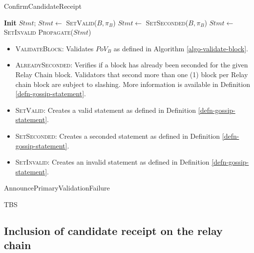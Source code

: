 \begin{algorithm}
  \caption[]{\sc ConfirmCandidateReceipt}
  \label{algo-endorse-candidate-receipt}
  \begin{algorithmic}[1]
      \State \textbf{Init} $Stmt$;
          \State $Stmt \leftarrow$ \textsc{SetValid($B, \pi_B$)}
        \Else
          \State $Stmt \leftarrow$ \textsc{SetSeconded($B, \pi_B$)}
        \EndIf
      \Else
        \State $Stmt \leftarrow$ \textsc{SetInvalid}
      \EndIf
      \State \textsc{Propagate}($Stmt$)
  \end{algorithmic}
\end{algorithm}

\begin{itemize}
  \item \textsc{ValidateBlock}: Validates $PoV_B$ as defined in Algorithm
  \ref{algo-validate-block}.
  \item \textsc{AlreadySeconded}: Verifies if a block has already been seconded
  for the given Relay Chain block. Validators that second more than one (1)
  block per Relay chain block are subject to slashing. More information is
  available in Definition \ref{defn-gossip-statement}.
  \item \textsc{SetValid}: Creates a valid statement as defined in Definition
  \ref{defn-gossip-statement}.
  \item \textsc{SetSeconded}: Creates a seconded statement as defined in
  Definition \ref{defn-gossip-statement}.
  \item \textsc{SetInvalid}: Creates an invalid statement as defined in
  Definition \ref{defn-gossip-statement}.
\end{itemize}

\begin{algorithm}
  \caption[]{\sc AnnouncePrimaryValidationFailure}
  \label{algo-announce-primary-validation-failure}
  \begin{algorithmic}[1]
    \Require{}

    \State TBS
  \end{algorithmic}
\end{algorithm}

\subsection{Inclusion of candidate receipt on the relay chain}\label{sect-inclusion-of-candidate-receipt}

